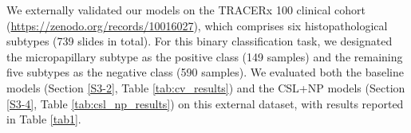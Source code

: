 \documentclass[journal,twoside,web]{ieeecolor}
\begin{document}
We externally validated our models on the TRACERx 100 clinical cohort (\url{https://zenodo.org/records/10016027}), which comprises six histopathological subtypes (739 slides in total). For this binary classification task, we designated the micropapillary subtype as the positive class (149 samples) and the remaining five subtypes as the negative class (590 samples). We evaluated both the baseline models (Section \ref{S3-2}, Table \ref{tab:cv_results}) and the CSL+NP models (Section \ref{S3-4}, Table \ref{tab:csl_np_results}) on this external dataset, with results reported in Table \ref{tab1}.

\begin{table}[htbp]
    \centering
    \caption{The prediction performance of Baseline and NP with CSL.}
    \label{tab1}
\end{table}
\end{document}
